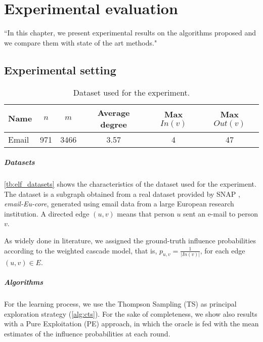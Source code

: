 \chapter{Experimental evaluation}
\label{ch:experiments}

``In this chapter, we present experimental results on the algorithms proposed and we compare them with state of the art methods." 

\section{Experimental setting}

\begin{table}[ht]
\centering
\renewcommand{\arraystretch}{1.2}
\begin{tabular}{|l|c|c|c|c|c|}\hline
\textbf{Name}&$n$&$m$&Average degree&Max $In(v)$&Max $Out(v)$\\ \hline\hline
Email&971&3466&3.57&4&47\\ \hline
\end{tabular}
\caption{Dataset used for the experiment.}
\label{tb:elf_datasets}
\end{table}

\paragraph{Datasets} \autoref{tb:elf_datasets} shows the characteristics of the dataset used for the experiment. The dataset is a subgraph obtained from a real dataset provided by SNAP \cite{snapnets}, \emph{email-Eu-core}, generated using email data from a large European research institution. A directed edge $(u, v)$ means that person $u$ sent an e-mail to person $v$.

As widely done in literature, we assigned the ground-truth influence probabilities according to the weighted cascade model, that is, $p_{u,v}=\frac{1}{|In(v)|}$, for each edge $(u,v) \in E$.

\paragraph{Algorithms}

For the learning process, we use the Thompson Sampling (TS) as principal exploration strategy (\autoref{alg:cts}). For the sake of completeness, we show also results with a Pure Exploitation (PE) approach, in which the oracle is fed with the mean estimates of the influence probabilities at each round.

